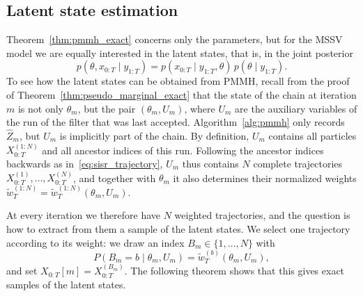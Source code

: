 \subsection{Latent state estimation}
\label{sec:latent_state_estimation}
Theorem~\ref{thm:pmmh_exact} concerns only the parameters, but for the MSSV model we are equally interested in the latent states, that is, in the joint posterior
\begin{equation}
    p(\theta,x_{0:T}\mid y_{1:T}) = p(x_{0:T}\mid y_{1:T},\theta)\,p(\theta\mid y_{1:T}).
    \label{eq:joint_posterior}
\end{equation}
To see how the latent states can be obtained from PMMH, recall from the proof of Theorem~\ref{thm:pseudo_marginal_exact} that the state of the chain at iteration $m$ is not only $\theta_m$, but the pair $(\theta_m,U_m)$, where $U_m$ are the auxiliary variables of the run of the filter that was last accepted. Algorithm~\ref{alg:pmmh} only records $\hat{Z}_m$, but $U_m$ is implicitly part of the chain. By definition, $U_m$ contains all particles $X_{0:T}^{(1:N)}$ and all ancestor indices of this run. Following the ancestor indices backwards as in~\eqref{eq:sisr_trajectory}, $U_m$ thus contains $N$ complete trajectories $X_{0:T}^{(1)},\ldots,X_{0:T}^{(N)}$, and together with $\theta_m$ it also determines their normalized weights $\tilde{w}_T^{(1:N)} = \tilde{w}_T^{(1:N)}(\theta_m,U_m)$.

At every iteration we therefore have $N$ weighted trajectories, and the question is how to extract from them a sample of the latent states. We select one trajectory according to its weight: we draw an index $B_m\in\{1,\ldots,N\}$ with
\begin{equation}
    P\left(B_m=b\mid\theta_m,U_m\right) = \tilde{w}_T^{(b)}(\theta_m,U_m),
    \label{eq:trajectory_selection}
\end{equation}
and set $X_{0:T}[m] = X_{0:T}^{(B_m)}$. The following theorem shows that this gives exact samples of the latent states.

